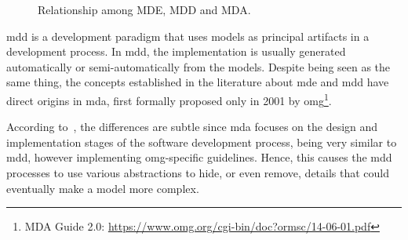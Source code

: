 \begin{figure}[!htb]
    \centering
    \caption{Relationship among MDE, MDD and MDA.}
    
    \label{fig:MDE}
\end{figure}

\ac{mdd} is a development paradigm that uses models as principal artifacts in a development process.
In \ac{mdd}, the implementation is usually generated automatically or semi-automatically from the models.
Despite being seen as the same thing, the concepts established in the literature about \ac{mde} and \ac{mdd} have direct origins in \ac{mda}, first formally proposed only in 2001 by \ac{omg}\footnote{MDA Guide 2.0: \url{ https://www.omg.org/cgi-bin/doc?ormsc/14-06-01.pdf}}.

According to~\cite{Sommerville:2015}, the differences are subtle since \ac{mda} focuses on the design and implementation stages of the software development process, being very similar to \ac{mdd}, however implementing \ac{omg}-specific guidelines.
Hence, this causes the \ac{mdd} processes to use various abstractions to hide, or even remove, details that could eventually make a model more complex.


